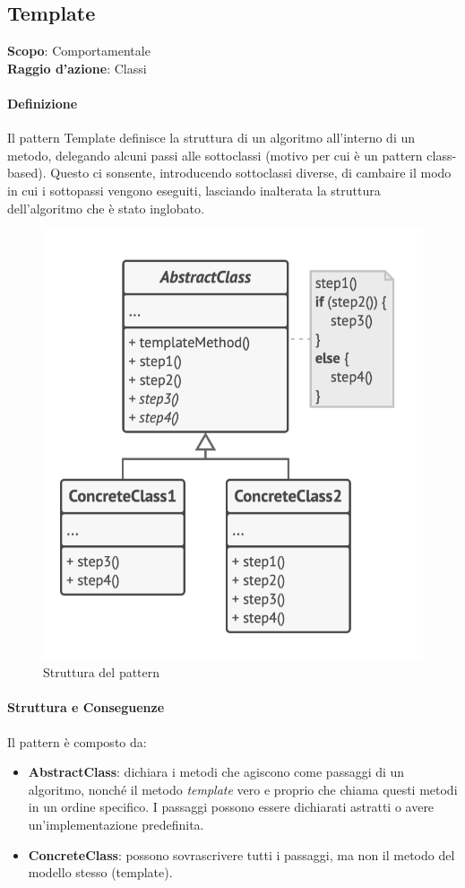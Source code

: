 \subsection{Template}
\label{template}

\textbf{Scopo}: Comportamentale \\
\textbf{Raggio d'azione}: Classi

\paragraph{Definizione} Il pattern Template definisce la struttura di un algoritmo all'interno di un metodo, delegando alcuni passi alle sottoclassi (motivo per cui è un pattern class-based). Questo ci sonsente, introducendo sottoclassi diverse, di cambaire il modo in cui i sottopassi vengono eseguiti, lasciando inalterata la struttura dell'algoritmo che è stato inglobato.

\begin{figure}[H]
    \centering
    \includegraphics[width=0.5\linewidth]{assets/pattern/template/template-struttura.png}
    \caption{Struttura del pattern}
\end{figure}

\paragraph{Struttura e Conseguenze} Il pattern è composto da:
\begin{itemize}
    \item \textbf{AbstractClass}: dichiara i metodi che agiscono come passaggi di un algoritmo, nonché il metodo \textit{template} vero e proprio che chiama questi metodi in un ordine specifico. I passaggi possono essere dichiarati astratti o avere un'implementazione predefinita.
    \item \textbf{ConcreteClass}: possono sovrascrivere tutti i passaggi, ma non il metodo del modello stesso (template).
\end{itemize}

